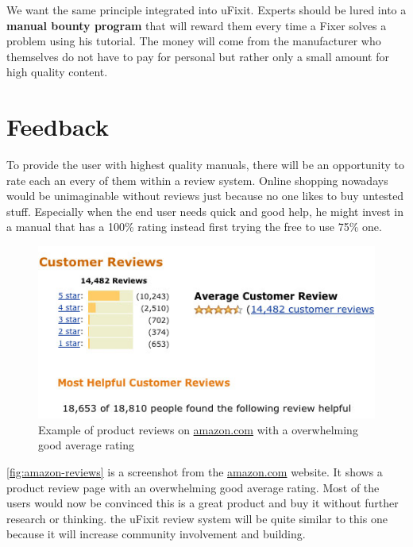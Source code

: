 		We want the same principle integrated into uFixit. Experts should be lured into a \textbf{manual bounty program} that will reward them every time a Fixer solves a problem using his tutorial. The money will come from the manufacturer who themselves do not have to pay for personal but rather only a small amount for high quality content.
	
	\section{Feedback}
	
		To provide the user with highest quality manuals, there will be an opportunity to rate each an every of them within a review system. Online shopping nowadays would be unimaginable without reviews just because no one likes to buy untested stuff. Especially when the end user needs quick and good help, he might invest in a manual that has a 100\% rating instead first trying the free to use 75\% one.

		\begin{figure}[H]
			\centering
			\includegraphics[width=0.7\linewidth]{../images/how-to-get-amazon-reviews-kindle.jpg}
			\caption{Example of product reviews on \url{amazon.com} with a overwhelming good average rating}
			\label{fig:amazon-reviews}
		\end{figure}
		
		\autoref{fig:amazon-reviews} is a screenshot from the \url{amazon.com} website. It shows a product review page with an overwhelming good average rating. Most of the users would now be convinced this is a great product and buy it without further research or thinking. the uFixit review system will be quite similar to this one because it will increase community involvement and building.
